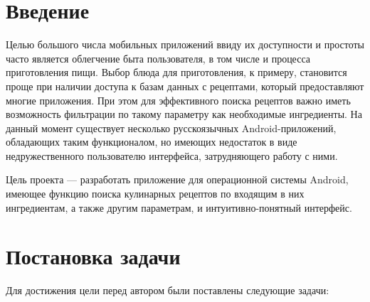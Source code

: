 \documentclass[14pt]{matmex-diploma-custom}
\begin{document}
\maketitle
\tableofcontents

\section*{Введение}

Целью большого числа мобильных приложений ввиду их доступности и простоты часто является облегчение быта пользователя, в том числе и процесса приготовления пищи. Выбор блюда для приготовления, к примеру, становится проще при наличии доступа к базам данных с рецептами, который предоставляют многие приложения. При этом для эффективного поиска рецептов важно иметь возможность фильтрации по такому параметру как необходимые ингредиенты. На данный момент существует несколько русскоязычных Android-приложений, обладающих таким функционалом, но имеющих недостаток в виде недружественного пользователю интерфейса, затрудняющего работу с ними.

Цель проекта --- разработать приложение для операционной системы Android, имеющее функцию поиска кулинарных рецептов по входящим в них ингредиентам, а также другим параметрам, и интуитивно-понятный интерфейс.

\section*{Постановка задачи}
Для достижения цели перед автором были поставлены следующие задачи:
\end{document}
